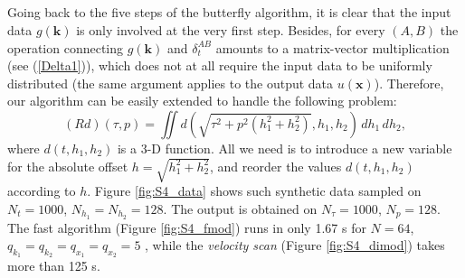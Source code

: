 
\subsection{}

Going back to the five steps of the butterfly algorithm, it is clear that the input data $g(\mathbf{k})$ is only involved at the very first step. Besides, for every $(A,B)$ the operation connecting $g(\mathbf{k})$ and $\delta_t^{AB}$ amounts to a matrix-vector multiplication (see (\ref{Delta1})), which does not at all require the input data to be uniformly distributed (the same argument applies to the output data $u(\mathbf{x})$). Therefore, our algorithm can be easily extended to handle the following problem:
\begin{equation}
(Rd)(\tau,p)=\iint d(\sqrt{\tau^2+p^2(h_1^2+h_2^2)},h_1,h_2)\,dh_1\,dh_2,
\end{equation}
where $d(t,h_1,h_2)$ is a 3-D function. All we need is to introduce a new variable for the absolute offset $h=\sqrt{h_1^2+h_2^2}$, and reorder the values $d(t,h_1,h_2)$ according to $h$. Figure \ref{fig:S4_data} shows such synthetic data sampled on $N_t=1000$, $N_{h_1}=N_{h_2}=128$. The output is obtained on $N_{\tau}=1000$, $N_p=128$. The fast algorithm (Figure \ref{fig:S4_fmod}) runs in only 1.67 s for $N=64$, $q_{k_1}=q_{k_2}=q_{x_1}=q_{x_2}=5$ , while the {\it velocity scan} (Figure \ref{fig:S4_dimod}) takes more than 125 s.

 




